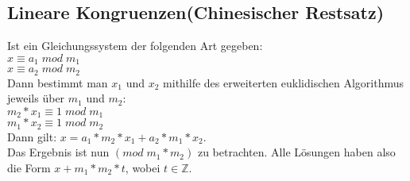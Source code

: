 \documentclass[11pt]{article}
\begin{document}
\subsection{Lineare Kongruenzen(Chinesischer Restsatz)}
Ist ein Gleichungssystem der folgenden Art gegeben:\\
$x \equiv a_1\; mod\; m_1$\\ $x \equiv a_2\; mod\; m_2$\\
Dann bestimmt man $x_1$ und $x_2$ mithilfe des erweiterten euklidischen Algorithmus jeweils {\"u}ber $m_1$ und $m_2$:\\
$m_2 * x_1 \equiv 1\; mod\; m_1$ \\ $m_1 * x_2 \equiv 1\; mod\; m_2$\\
Dann gilt: $x=a_1*m_2*x_1+a_2*m_1*x_2$.\\
Das Ergebnis ist nun $(mod\;m_1*m_2)$ zu betrachten. Alle L{\"o}sungen haben also die Form $x + m_1*m_2*t$, wobei $t\in \mathbb{Z}$.
\end{document}
